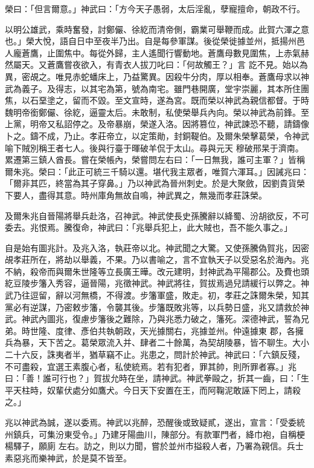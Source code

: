 \begin{pinyinscope}
 榮曰：「但言爾意。」神武曰：「方今天子愚弱，太后淫亂，孽寵擅命，朝政不行。



 以明公雄武，乘時奮發，討鄭儼、徐紇而清帝側，霸業可舉鞭而成。此賀六渾之意也。」榮大悅，語自日中至夜半乃出。自是每參軍謀。後從榮徙據並州，抵揚州邑人龐蒼鷹，止圍焦中。每從外歸，主人遙聞行響動地。蒼鷹母數見圍焦，上赤氣赫然屬天。又蒼鷹嘗夜欲入，有青衣人拔刀叱曰：「何故觸王？」言
 訖不見。始以為異，密覘之。唯見赤蛇蟠床上，乃益驚異。因殺牛分肉，厚以相奉。蒼鷹母求以神武為義子。及得志，以其宅為第，號為南宅。雖門巷開廣，堂宇崇麗，其本所住團焦，以石堊塗之，留而不毀。至文宣時，遂為宮。既而榮以神武為親信都督。于時魏明帝銜鄭儼、徐紇，逼靈太后。未敢制，私使榮舉兵內向。榮以神武為前鋒。至上黨，明帝又私詔停之。及帝暴崩，榮遂入洛。因將篡位，神武諫恐不聽，請鑄像卜之。鑄不成，乃止。孝莊帝立，以定策勛，封銅鞮伯。及爾朱榮擊葛榮，令神武喻下賊別稱王者七人。後與行臺于暉破羊侃于太山。尋與元天
 穆破邢杲于濟南。累遷第三鎮人酋長。嘗在榮帳內，榮嘗問左右曰：「一日無我，誰可主軍？」皆稱爾朱兆。榮曰：「此正可統三千騎以還。堪代我主眾者，唯賀六渾耳。」因誡兆曰：「爾非其匹，終當為其子穿鼻。」乃以神武為晉州刺史。於是大聚斂，因劉貴貨榮下要人，盡得其意。時州庫角無故自鳴，神武異之，無幾而孝莊誅榮。



 及爾朱兆自晉陽將舉兵赴洛，召神武。神武使長史孫騰辭以絳蜀、汾胡欲反，不可委去。兆恨焉。騰復命，神武曰：「兆舉兵犯上，此大賊也，吾不能久事之。」



 自是始有圖兆計。及兆入洛，執莊帝以北。神武聞之大驚。又使孫騰偽賀兆，因密
 覘孝莊所在，將劫以舉義，不果。乃以書喻之，言不宜執天子以受惡名於海內。兆不納，殺帝而與爾朱世隆等立長廣王曄。改元建明，封神武為平陽郡公。及費也頭紇豆陵步籓入秀容，逼晉陽，兆徵神武。神武將往，賀拔焉過兒請緩行以弊之。神武乃往逗留，辭以河無橋，不得渡。步籓軍盛，敗走。初，孝莊之誅爾朱榮，知其黨必有逆謀，乃密敕步籓，令襲其後。步籓既敗兆等，以兵勢日盛，兆又請救於神武。神武內圖兆，復慮步籓後之難除，乃與兆悉力破之，籓死。深德神武，誓為兄弟。時世隆、度律、彥伯共執朝政，天光據關右，兆據並州。仲遠據東
 郡，各擁兵為暴，天下苦之。葛榮眾流入并、肆者二十餘萬，為契胡陵暴，皆不聊生。大小二十六反，誅夷者半，猶草竊不止。兆患之，問計於神武。神武曰：「六鎮反殘，不可盡殺，宜選王素腹心者，私使統焉。若有犯者，罪其帥，則所罪者寡。」兆曰：「善！誰可行也？」賀拔允時在坐，請神武。神武拳毆之，折其一齒，曰：「生平天柱時，奴輩伏處分如鷹犬。今日天下安置在王，而阿鞠泥敢誣下罔上，請殺之。」



 兆以神武為誠，遂以委焉。神武以兆醉，恐醒後或致疑貳，遂出，宣言：「受委統州鎮兵，可集汾東受令。」乃建牙陽曲川，陳部分。有款軍門者，絳巾袍，自稱梗楊驛子，願廁
 左右。訪之，則以力聞，嘗於並州市搤殺人者，乃署為親信。兵士素惡兆而樂神武，於是莫不皆至。




\end{pinyinscope}
